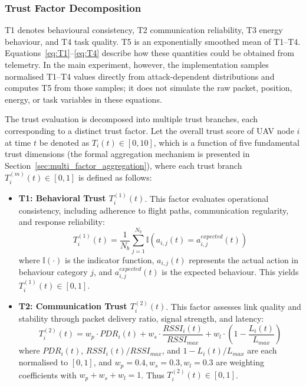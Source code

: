 \documentclass[notspecified,article,submit,moreauthors]{Definitions/mdpi}
\begin{document}
\subsubsection{Trust Factor Decomposition}
T1 denotes behavioural consistency, T2 communication reliability, T3 energy behaviour, and T4 task quality. T5 is an exponentially smoothed mean of T1--T4. Equations~\ref{eq:T1}--\ref{eq:T4} describe how these quantities could be obtained from telemetry. In the main experiment, however, the implementation samples normalised T1--T4 values directly from attack-dependent distributions and computes T5 from those samples; it does not simulate the raw packet, position, energy, or task variables in these equations.

The trust evaluation is decomposed into multiple trust branches, each corresponding to a distinct trust factor. Let the overall trust score of UAV node $i$ at time $t$ be denoted as $T_i(t) \in [0, 10]$, which is a function of five fundamental trust dimensions (the formal aggregation mechanism is presented in Section~\ref{sec:multi_factor_aggregation}),
where each trust branch $T_i^{(m)}(t) \in [0, 1]$ is defined as follows:

\begin{itemize}
    \item \textbf{T1: Behavioral Trust $T_i^{(1)}(t)$}. This factor evaluates operational consistency, including adherence to flight paths, communication regularity, and response reliability:
    \begin{equation}\label{eq:T1}
    T_i^{(1)}(t) = \frac{1}{N_b} \sum_{j=1}^{N_b} \mathbb{I}\!\left(a_{i,j}(t) = a_{i,j}^{expected}(t)\right)
    \end{equation}
    where $\mathbb{I}(\cdot)$ is the indicator function, $a_{i,j}(t)$ represents the actual action in behaviour category $j$, and $a_{i,j}^{expected}(t)$ is the expected behaviour. This yields $T_i^{(1)}(t) \in [0, 1]$.
\end{itemize}

\begin{itemize}
\item \textbf{T2: Communication Trust $T_i^{(2)}(t)$}. This factor assesses link quality and stability through packet delivery ratio, signal strength, and latency:
\begin{equation}\label{eq:T2}
T_i^{(2)}(t) = w_p \cdot PDR_i(t) + w_s \cdot \frac{RSSI_i(t)}{RSSI_{max}} + w_l \cdot \left(1 - \frac{L_i(t)}{L_{max}}\right)
\end{equation}
where $PDR_i(t)$, $RSSI_i(t)/RSSI_{max}$, and $1 - L_i(t)/L_{max}$ are each normalised to $[0, 1]$, and $w_p = 0.4, w_s = 0.3, w_l = 0.3$ are weighting coefficients with $w_p + w_s + w_l = 1$. Thus $T_i^{(2)}(t) \in [0, 1]$.
\end{itemize}
\end{document}
